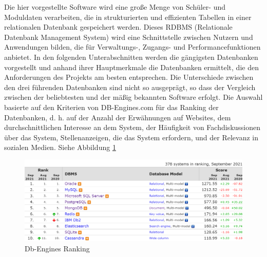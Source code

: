 Die hier vorgestellte Software wird eine große Menge von Schüler- und Moduldaten verarbeiten, die in strukturierten und effizienten  
Tabellen in einer relationalen Datenbank gespeichert werden. Dieses RDBMS (Relationale Datenbank Management System) wird eine Schnittstelle 
zwischen Nutzern und Anwendungen bilden, die für Verwaltungs-, Zugangs- und Performancefunktionen anbietet. In den folgenden Unterabschnitten 
werden die gängigsten Datenbanken vorgestellt und anhand ihrer Hauptmerkmale die Datenbanken ermittelt, die den Anforderungen des Projekts am 
besten entsprechen. Die Unterschiede zwischen den drei führenden Datenbanken sind nicht so ausgeprägt, so dass der Vergleich zwischen
der beliebtesten und der mäßig bekannten Software erfolgt. Die Auswahl basierte auf den Kriterien von DB-Engines.com für das Ranking 
der Datenbanken, d. h. auf der Anzahl der Erwähnungen auf Websites, dem durchschnittlichen Interesse an dem System, der Häufigkeit 
von Fachdiskussionen über das System, Stellenanzeigen, die das System erfordern, und der Relevanz in sozialen Medien. 
Siehe Abbildung \ref{db_engines_ranking}
\begin{figure}[h]
    \begin{center}
        \includegraphics[scale=0.5]{./pics/db_engines_ranking.png}
        \caption{Db-Engines Ranking}
        \label{db_engines_ranking}
    \end{center}
\end{figure}
\newpage